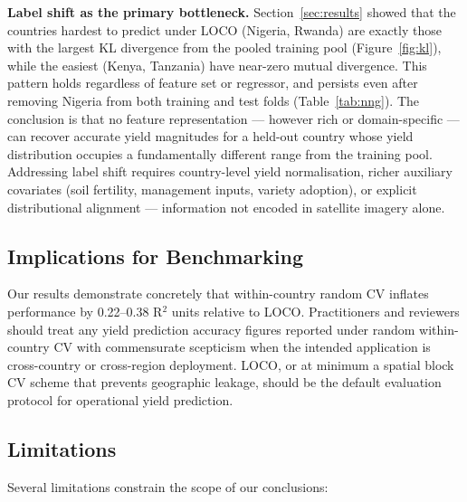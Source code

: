\documentclass[journal]{IEEEtran}
\begin{document}
\textbf{Label shift as the primary bottleneck.}
Section~\ref{sec:results} showed that the countries hardest to predict under
LOCO (Nigeria, Rwanda) are exactly those with the largest KL divergence from
the pooled training pool (Figure~\ref{fig:kl}), while the easiest (Kenya,
Tanzania) have near-zero mutual divergence.
This pattern holds regardless of feature set or regressor, and persists even
after removing Nigeria from both training and test folds
(Table~\ref{tab:nng}).
The conclusion is that no feature representation — however rich or
domain-specific — can recover accurate yield magnitudes for a held-out country
whose yield distribution occupies a fundamentally different range from the
training pool.
Addressing label shift requires country-level yield normalisation,
richer auxiliary covariates (soil fertility, management inputs, variety
adoption), or explicit distributional alignment — information not encoded
in satellite imagery alone.

\subsection{Implications for Benchmarking}

Our results demonstrate concretely that within-country random CV
inflates performance by 0.22--0.38 R$^2$ units relative to LOCO.
Practitioners and reviewers should treat any yield prediction accuracy
figures reported under random within-country CV with commensurate
scepticism when the intended application is cross-country or
cross-region deployment.
LOCO, or at minimum a spatial block CV scheme that prevents
geographic leakage, should be the default evaluation protocol
for operational yield prediction.

\subsection{Limitations}
\label{sec:limits}

Several limitations constrain the scope of our conclusions:
\end{document}
